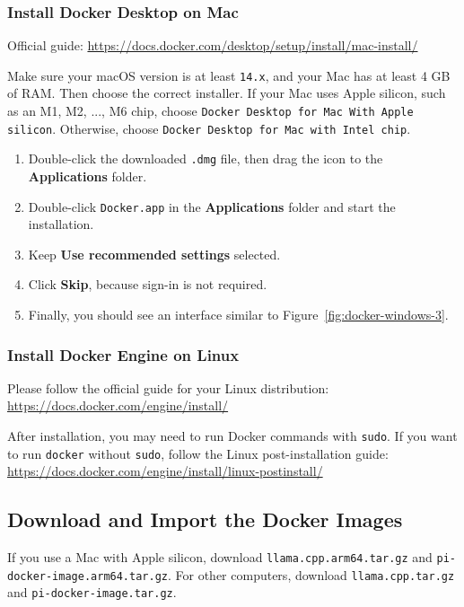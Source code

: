 \documentclass[a4paper,12pt]{article}
\newcommand{\code}[1]{\texttt{\nolinkurl{#1}}}
\begin{document}
\subsubsection{Install Docker Desktop on Mac}

Official guide: \url{https://docs.docker.com/desktop/setup/install/mac-install/}

Make sure your macOS version is at least \texttt{14.x}, and your Mac has at least 4 GB of RAM. Then choose the correct installer. If your Mac uses Apple silicon, such as an M1, M2, ..., M6 chip, choose \texttt{Docker Desktop for Mac With Apple silicon}. Otherwise, choose \texttt{Docker Desktop for Mac with Intel chip}.

\begin{enumerate}
\item Double-click the downloaded \texttt{.dmg} file, then drag the icon to the \textbf{Applications} folder.
\item Double-click \texttt{Docker.app} in the \textbf{Applications} folder and start the installation.
\item Keep \textbf{Use recommended settings} selected.
\item Click \textbf{Skip}, because sign-in is not required.
\item Finally, you should see an interface similar to Figure~\ref{fig:docker-windows-3}.
\end{enumerate}

\subsubsection{Install Docker Engine on Linux}

Please follow the official guide for your Linux distribution: \url{https://docs.docker.com/engine/install/}

After installation, you may need to run Docker commands with \texttt{sudo}. If you want to run \texttt{docker} without \texttt{sudo}, follow the Linux post-installation guide: \url{https://docs.docker.com/engine/install/linux-postinstall/}

\subsection{Download and Import the Docker Images}

If you use a Mac with Apple silicon, download \code{llama.cpp.arm64.tar.gz} and \code{pi-docker-image.arm64.tar.gz}. For other computers, download \code{llama.cpp.tar.gz} and \code{pi-docker-image.tar.gz}.
\end{document}
